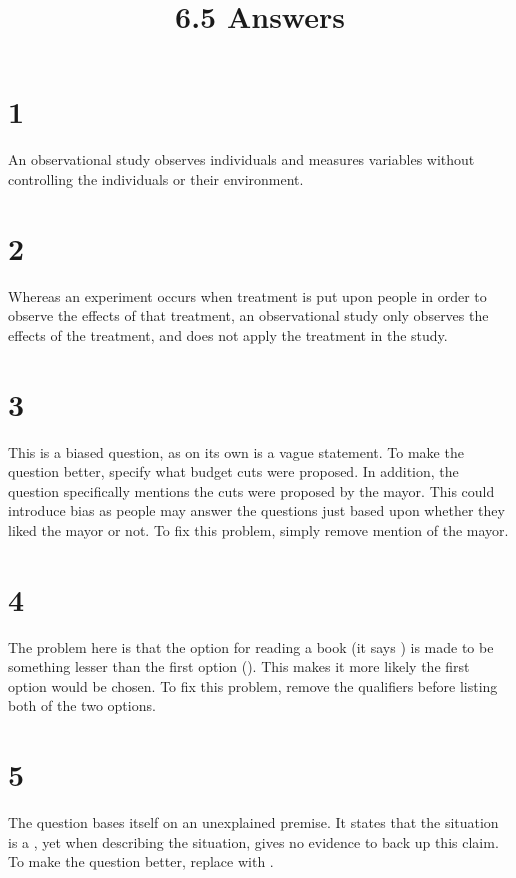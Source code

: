 \documentclass{article}
\title{6.5 Answers}
\theoremstyle{definition}
\newcommand{\?}{\stackrel{?}{=}}
\begin{document}
\maketitle

\section*{1}
An observational study observes individuals and measures variables without controlling the individuals or their environment.

\section*{2}
Whereas an experiment occurs when treatment is put upon people in order to observe the effects of that treatment, an observational study only observes the 
effects of the treatment, and does not apply the treatment in the study.

\section*{3}
This is a biased question, as  on its own is a vague statement. To make the question better, specify what budget cuts were 
proposed. In addition, the question specifically mentions the cuts were proposed by the mayor. This could introduce bias as people may answer the questions just based upon whether they liked the 
mayor or not. To fix this problem, simply remove mention of the mayor.

\section*{4}
The problem here is that the option for reading a book (it says ) is made to be something lesser than the first option 
(). This makes it more likely the first option would be chosen. To fix this problem, remove the qualifiers before listing both of the two options.

\section*{5}
The question bases itself on an unexplained premise. It states that the situation is a , yet when describing the situation, gives no evidence 
to back up this claim. To make the question better, replace  with .
\end{document}
